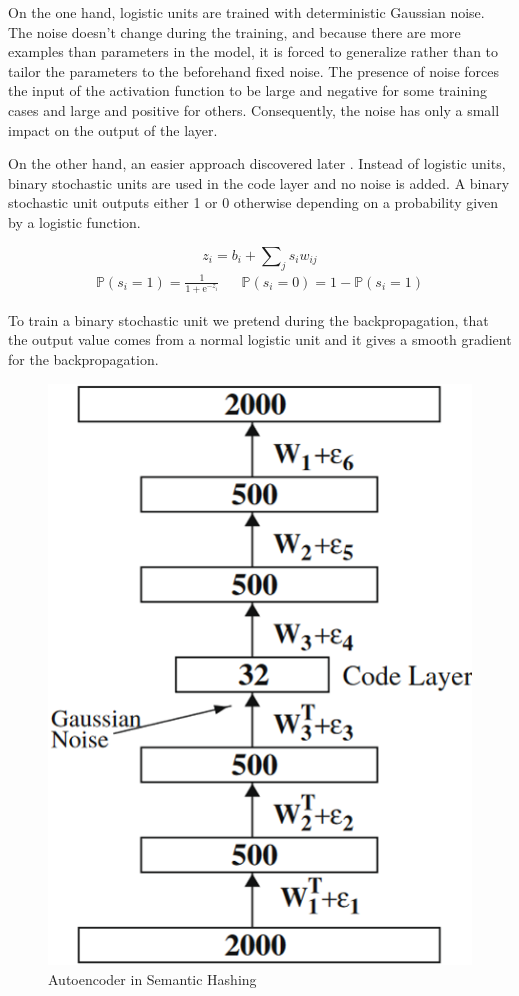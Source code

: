 On the one hand, logistic units are trained with deterministic Gaussian noise. The noise doesn't change during the training, and because there are more examples than parameters in the model, it is forced to generalize rather than to tailor the parameters to the beforehand fixed noise. The presence of noise forces the input of the activation function to be large and negative for some training cases and large and positive for others. Consequently, the noise has only a small impact on the output of the layer.

On the other hand, an easier approach discovered later \cite{krizhevsky2011using}. Instead of logistic units, binary stochastic units are used in the code layer and no noise is added. A binary stochastic unit outputs either 1 or 0 otherwise depending on a probability given by a logistic function.

\[z_i=b_i+\sum\nolimits_{j}s_{i}w_{ij}\]
\begin{align*}
\mathbb{P}(s_i=1)=\frac{1}{1+\textrm{e}^{-z_i}} && \mathbb{P}(s_i=0)=1-\mathbb{P}(s_i=1)
\end{align*}

To train a binary stochastic unit we pretend during the backpropagation, that the output value comes from a normal logistic unit and it gives a smooth gradient for the backpropagation.

\begin{figure}
	\centering
	\includegraphics[height=0.3\textheight]{img/auto_encoder.png}
	\caption{Autoencoder in Semantic Hashing}
	\label{fig:auto_encoder}
\end{figure}


